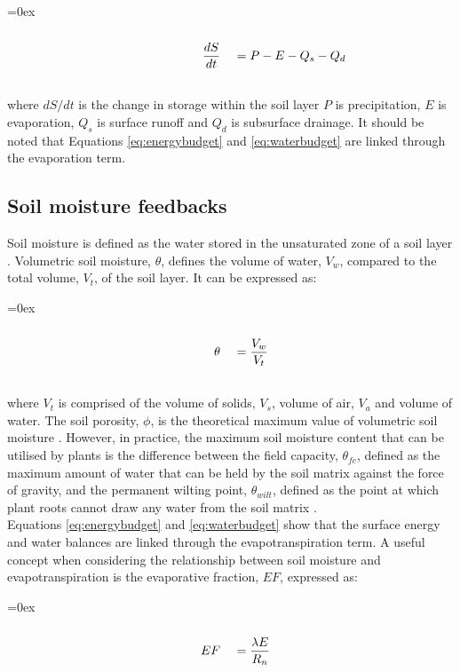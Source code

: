 \documentclass{icldt}\usepackage[]{graphicx}\usepackage[]{color}
\def\leftalgn{0.45}\def\rightalgn{0.45}
\def\algnrow{\rule{\leftalgn\textwidth}{0ex}&\rule{\rightalgn\textwidth}{0ex}}
\newenvironment{algneqn}{%
  \arraycolsep=0ex\renewcommand\arraystretch{0}%
  \begin{equation}%
  \begin{array}{rl}%
  \algnrow\\}%
 {\\\algnrow%
  \end{array}%
  \end{equation}\ignorespacesafterend%
}
\begin{document}
\begin{algneqn} \label{eq:waterbudget}
\dfrac{dS}{dt}\ &= P - E - Q_{s} - Q_{d}
\end{algneqn}

\noindent where $ dS/dt $ is the change in storage within the soil layer $ P $ is precipitation, $ E $ is evaporation, $ Q_{s} $ is surface runoff and $ Q_{d} $ is subsurface drainage. It should be noted that Equations \ref{eq:energybudget} and \ref{eq:waterbudget} are linked through the evaporation term. \\

\subsection{Soil moisture feedbacks}

Soil moisture is defined as the water stored in the unsaturated zone of a soil layer \citep{Hillel1998}. Volumetric soil moisture, $ \theta $, defines the volume of water, $ V_{w} $, compared to the total volume, $ V_{t} $, of the soil layer. It can be expressed as: 

\begin{algneqn} \label{eq:volumetric_sm}
\theta\ &= \dfrac{V_{w}}{V_{t}}
\end{algneqn}

\noindent where $ V_{t} $ is comprised of the volume of solids, $ V_{s} $, volume of air, $ V_{a} $ and volume of water. The soil porosity, $ \phi $, is the theoretical maximum value of volumetric soil moisture \citep{Shaw1994}. However, in practice, the maximum soil moisture content that can be utilised by plants is the difference between the field capacity, $ \theta_{fc} $, defined as the maximum amount of water that can be held by the soil matrix against the force of gravity, and the permanent wilting point, $ \theta_{wilt} $, defined as the point at which plant roots cannot draw any water from the soil matrix \citep{Shaw1994}. \\
   
Equations \ref{eq:energybudget} and \ref{eq:waterbudget} show that the surface energy and water balances are linked through the evapotranspiration term. A useful concept when considering the relationship between soil moisture and evapotranspiration is the evaporative fraction, $ EF $, expressed as:

\begin{algneqn} \label{eq:evaporativefraction}
EF\ &= \dfrac{\lambda E}{R_{n}}
\end{algneqn}
\end{document}
